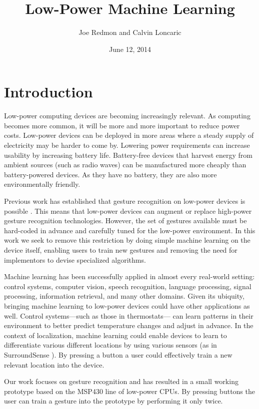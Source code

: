 \documentclass[12pt]{article}
\title{Low-Power Machine Learning}
\author{Joe Redmon and Calvin Loncaric}
\date{June 12, 2014}
\begin{document}
\maketitle

\section{Introduction}

Low-power computing devices are becoming increasingly relevant. As computing
becomes more common, it will be more and more important to reduce power costs.
Low-power devices can be deployed in more areas where a steady supply of
electricity may be harder to come by. Lowering power requirements can increase
usability by increasing battery life. Battery-free devices that harvest energy
from ambient sources (such as radio waves) can be manufactured more cheaply
than battery-powered devices. As they have no battery, they are also more
environmentally friendly.

Previous work has established that gesture recognition on low-power devices is
possible \cite{allsee}. This means that low-power devices can augment or
replace high-power gesture recognition technologies. However, the set of
gestures available must be hard-coded in advance and carefully tuned for the
low-power environment. In this work we seek to remove this restriction by doing
simple machine learning on the device itself, enabling users to train new
gestures and removing the need for implementors to devise specialized
algorithms.

Machine learning has been successfully applied in almost every real-world
setting: control systems, computer vision, speech recognition, language
processing, signal processing, information retrieval, and many other domains.
Given its ubiquity, bringing machine learning to low-power devices could have
other applications as well. Control systems---such as those in thermostats---%
can learn patterns in their environment to better predict temperature changes
and adjust in advance. In the context of localization, machine learning could
enable devices to learn to differentiate various different locations by using
various sensors (as in SurroundSense \cite{surroundsense}). By pressing a
button a user could effectively train a new relevant location into the device.

Our work focuses on gesture recognition and has resulted in a small working
prototype based on the MSP430 line of low-power CPUs. By pressing buttons the
user can train a gesture into the prototype by performing it only twice.
\end{document}

